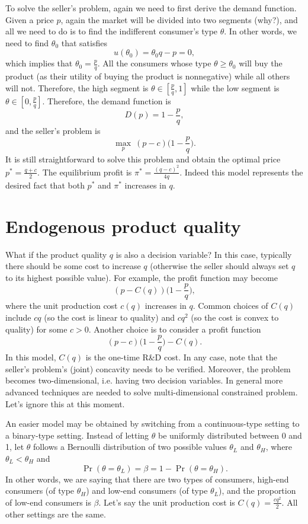 \documentclass[11pt,a4paper]{article}
\begin{document}
To solve the seller's problem, again we need to first derive the demand function. 
Given a price $p$, again the market will be divided into two segments (why?), 
and all we need to do is to find the indifferent consumer's type $\theta$. 
In other words, we need to find $\theta_0$ that satisfies
\[
	u(\theta_0) = \theta_0 q - p = 0, 
\]
which implies that $\theta_0 = \frac{p}{q}$. All the consumers whose type 
$\theta \geq \theta_0$ will buy the product (as their utility of buying 
the product is nonnegative) while all others will not. Therefore, 
the high segment is $\theta \in [\frac{p}{q}, 1]$ while the low segment
is $\theta \in [0, \frac{p}{q}]$. 
Therefore, the demand function is 
\[
	D(p) = 1 - \frac{p}{q}, 
\]
and the seller's problem is 
\[
	\max_p \ (p - c)\bigg(1 - \frac{p}{q}\bigg). 
\]
It is still straightforward to solve this problem and obtain the optimal price 
$p^* = \frac{q + c}{2}$. The equilibrium profit is $\pi^* = \frac{(q - c)^2}{4q}$. 
Indeed this model represents the desired fact that both $p^*$ and $\pi^*$ increases
in $q$. 







\section{Endogenous product quality}

What if the product quality $q$ is also a decision variable? 
In this case, typically there should be some cost to increase $q$
(otherwise the seller should always set $q$ to its highest possible value). 
For example, the profit function may become 
\[
	(p - C(q))\bigg(1 - \frac{p}{q}\bigg), 
\]
where the unit production cost $c(q)$ increases in $q$. 
Common choices of $C(q)$ include $cq$ (so the cost is linear to quality)
and $cq^2$ (so the cost is convex to quality) for some $c > 0$.  
Another choice is to consider a profit function
\[
	(p - c)\bigg(1 - \frac{p}{q}\bigg) - C(q). 
\]
In this model, $C(q)$ is the one-time R\&D cost. In any case, 
note that the seller's problem's (joint) concavity needs to be verified. 
Moreover, the problem becomes two-dimensional, i.e. having two decision variables. 
In general more advanced techniques are needed to solve multi-dimensional 
constrained problem. Let's ignore this at this moment. 

An easier model may be obtained by switching from a continuous-type setting 
to a binary-type setting. Instead of letting $\theta$ be uniformly distributed 
between 0 and 1, let $\theta$ follows a Bernoulli distribution of two possible 
values $\theta_L$ and $\theta_H$, where $\theta_L < \theta_H$ and 
\[
	\Pr(\theta = \theta_L) = \beta = 1 - \Pr(\theta = \theta_H).
\]
In other words, we are saying that there are two types of consumers, 
high-end consumers (of type $\theta_H$) and low-end consumers (of type $\theta_L$), 
and the proportion of low-end consumers is $\beta$. 
Let's say the unit production cost is $C(q) = \frac{cq^2}{2}$. 
All other settings are the same. 
\end{document}
